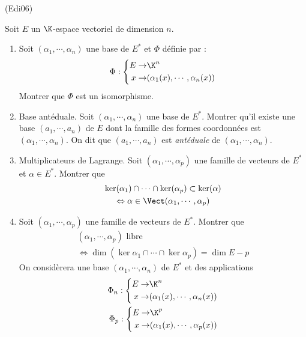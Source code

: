 \begin{tiny}(Edi06)\end{tiny}
Soit $E$ un $\K$-espace vectoriel de dimension $n$.
\begin{enumerate}
\item Soit $(\alpha_1,\cdots,\alpha_n)$ une base de $E^*$ et $\Phi$ définie par :
\begin{displaymath}
 \Phi :\left\lbrace 
\begin{aligned}
 E \rightarrow& \K^n \\
 x \rightarrow& (\alpha_1(x),\cdots,\alpha_n(x))
\end{aligned}
\right. 
\end{displaymath}
Montrer que $\Phi$ est un isomorphisme.

\item Base antéduale.\newline
Soit $(\alpha_1,\cdots,\alpha_n)$ une base de $E^*$. Montrer qu'il existe une base $(a_1,\cdots,a_n)$ de $E$ dont la famille des formes coordonnées est $(\alpha_1,\cdots,\alpha_n)$. On dit que $(a_1,\cdots,a_n)$ est \emph{antéduale} de $(\alpha_1,\cdots,\alpha_n)$.

\item Multiplicateurs de Lagrange.\newline
Soit $(\alpha_1,\cdots,\alpha_p)$ une famille de vecteurs de $E^*$ et $\alpha\in E^*$. Montrer que
\begin{multline*}
  \ker(\alpha_1) \cap \cdots \cap \ker(\alpha_p) \subset \ker(\alpha) \\
  \Leftrightarrow
  \alpha \in \Vect(\alpha_1,\cdots, \alpha_p)
\end{multline*}

\item Soit $(\alpha_1,\cdots,\alpha_p)$ une famille de vecteurs de $E^*$. Montrer que  
\begin{multline*}
(\alpha_1,\cdots,\alpha_p) \text{ libre } \\
\Leftrightarrow
 \dim(\ker \alpha_1\cap\cdots\cap\ker\alpha_p) = \dim E -p
\end{multline*}
On considèrera une base $(\alpha_1,\cdots,\alpha_n)$ de $E^*$ et des applications
\begin{align*}
 \Phi_n :\left\lbrace 
\begin{aligned}
 E \rightarrow& \K^n \\
 x \rightarrow& (\alpha_1(x),\cdots,\alpha_n(x))
\end{aligned}
\right. \\
 \Phi_p :\left\lbrace 
\begin{aligned}
 E \rightarrow& \K^p \\
 x \rightarrow& (\alpha_1(x),\cdots,\alpha_p(x))
\end{aligned}
\right. 
\end{align*}

\end{enumerate}
